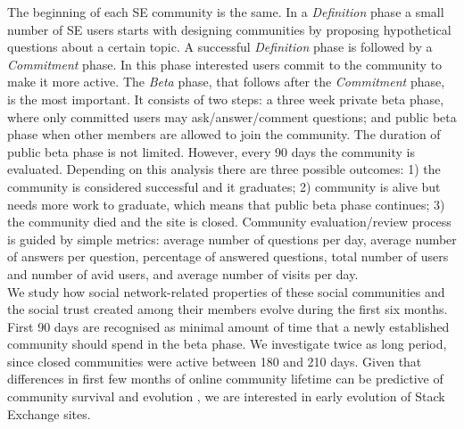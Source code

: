 The beginning of each SE community is the same. In a \textit{Definition} phase a small number of SE users starts with designing communities by proposing hypothetical questions about a certain topic. A successful \textit{Definition} phase is followed by a \textit{Commitment} phase. In this phase interested users commit to the community to make it more active. The \textit{Beta} phase, that follows after the \textit{Commitment} phase, is the most important. It consists of two steps: a three week private beta phase, where only committed users may ask/answer/comment questions; and public beta phase when other members are allowed to join the community. The duration of public beta phase is not limited. However, every 90 days the community is evaluated. Depending on this analysis there are three possible outcomes: 1) the community is considered successful and it graduates; 2) community is alive but needs more work to graduate, which means that public beta phase continues; 3) the community died and the site is closed. Community evaluation/review process is guided by simple metrics: average number of questions per day, average number of answers per question, percentage of answered questions, total number of users and number of avid users, and average number of visits per day.\\

We study how social network-related properties of these social communities and the social trust created among their members evolve during the first six months. First 90 days are recognised as minimal amount of time that a newly established community should spend in the beta phase. We investigate twice as long period, since closed communities were active between 180 and 210 days. Given that differences in first few months of online community lifetime can be predictive of community survival and evolution \cite{dover2020sustainable}, we are interested in early evolution of Stack Exchange sites. 

